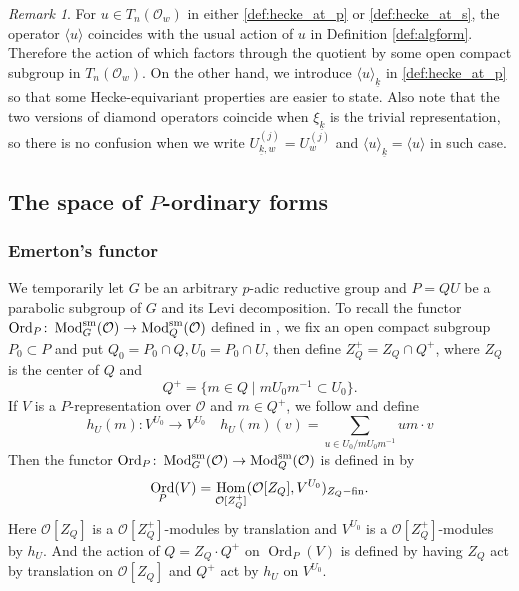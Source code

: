 \documentclass[leqno]{amsart}
\theoremstyle{definition}
\theoremstyle{remark}
\newtheorem{rem}[thm]{Remark}
\newcommand{\oo}{\mathcal{O}}
\DeclareMathOperator{\Hom}{Hom}
\DeclareMathOperator{\Mod}{\textnormal{Mod}}
\DeclareMathOperator{\Ord}{Ord} %
\newcommand{\sm}{\textnormal{sm}}
\newcommand{\wt}[1]{\underline{ #1 }}
\begin{document}
\begin{rem}
For $u\in T_n(\oo_w)$ in either 
\eqref{def:hecke_at_p} or \eqref{def:hecke_at_s},
the operator $\langle u\rangle$
coincides with the usual action of $u$ in
Definition \ref{def:algform}.
Therefore the action of which
factors through the quotient by some 
open compact subgroup in $T_n(\oo_w)$.
On the other hand, 
we introduce $\langle u\rangle_{\wt{k}}$
in \eqref{def:hecke_at_p}
so that some Hecke-equivariant properties
are easier to state.
Also note that the two versions of diamond operators
coincide when $\xi_{\wt{k}}$ is the trivial representation,
so there is no confusion when we write
$U_{\wt{k},w}^{(j)}=U_{w}^{(j)}$ and 
$\langle u\rangle_{\wt{k}}=\langle u\rangle$ in such case.
\end{rem}





\subsection{The space of $P$-ordinary forms}



\subsubsection{Emerton's functor}

We temporarily let $G$ be an arbitrary $p$-adic reductive group
and $P=QU$ be a parabolic subgroup of $G$ and its Levi decomposition.
To recall the functor 
$\Ord_P\colon \Mod_G^{\sm}(\oo)\to \Mod_Q^{\sm}(\oo)$
defined in \cite{emeI},
we fix an open compact subgroup $P_0\subset P$
and put $Q_0=P_0\cap Q, U_0=P_0\cap U$,
then define $Z_Q^+=Z_Q\cap Q^+$,
where $Z_Q$ is the center of $Q$ and
\[
	Q^+=\{m\in Q\mid mU_0m^{-1}\subset U_0\}.
\]
If  $V$ is a $P$-representation over $\oo$
and  $m\in Q^+$,
we follow \cite[Def 3.1.3]{emeI} and define
\begin{equation}\label{def:hUm}
	 h_{U}(m)\colon V^{U_0}\to V^{U_0}\quad
	 h_{U}(m)(v)=\sum_{u\in U_0/m U_0 m^{-1}}um\cdot v
\end{equation}
Then the functor
$\Ord_P\colon \Mod_G^{\sm}(\oo)\to \Mod_Q^{\sm}(\oo)$
is defined in \cite[Def 3.1.3]{emeI} by
\begin{equation}\label{def:OrdP}
	\Ord_P(V)=\Hom_{\oo[Z_Q^+]}
    (\oo[Z_Q], V^{U_0})_{Z_Q-\textnormal{fin}}.
\end{equation}
Here $\oo[Z_Q]$ is a $\oo[Z_Q^+]$-modules by translation
and $V^{U_0}$ is a $\oo[Z_Q^+]$-modules by $h_U$.
And the action of $Q=Z_Q\cdot Q^+$ on $\Ord_P(V)$ is defined by 
having $Z_Q$ act by translation on $\oo[Z_Q]$ and 
$Q^+$ act by $h_U$ on $V^{U_0}$.
\end{document}
